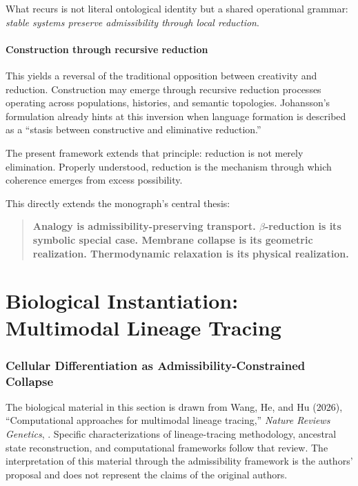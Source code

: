 \documentclass[12pt, a4paper]{article}
\theoremstyle{plain}
\theoremstyle{definition}
\theoremstyle{remark}
\begin{document}
What recurs is not literal ontological identity but a shared
operational grammar: \emph{stable systems preserve admissibility
through local reduction}.

\subsection{Construction through recursive reduction}

This yields a reversal of the traditional opposition between creativity
and reduction.
Construction may emerge through recursive reduction processes operating
across populations, histories, and semantic topologies.
Johansson's formulation already hints at this inversion when language
formation is described as a ``stasis between constructive and
eliminative reduction.''

The present framework extends that principle: reduction is not merely
elimination.
Properly understood, reduction is the mechanism through which coherence
emerges from excess possibility.

This directly extends the monograph's central thesis:
\begin{quote}
  \textbf{Analogy is admissibility-preserving transport.
  $\beta$-reduction is its symbolic special case.
  Membrane collapse is its geometric realization.
  Thermodynamic relaxation is its physical realization.}
\end{quote}

\part{Biological Instantiation: Multimodal Lineage Tracing}

\section{Cellular Differentiation as Admissibility-Constrained Collapse}
\label{sec:lineage}

\begin{established}
  The biological material in this section is drawn from Wang, He, and
  Hu (2026), ``Computational approaches for multimodal lineage tracing,''
  \textit{Nature Reviews Genetics}, .
  Specific characterizations of lineage-tracing methodology, ancestral
  state reconstruction, and computational frameworks follow that review.
  The interpretation of this material through the admissibility framework
  is the authors' proposal and does not represent the claims of the
  original authors.
\end{established}
\end{document}

